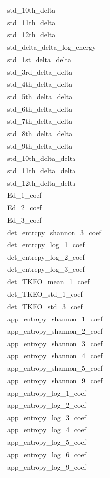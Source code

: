 \documentclass[
]{article}
\begin{document}
\begin{table}
\begin{tabular}{l}
std\_10th\_delta\\
std\_11th\_delta\\
\addlinespace
std\_12th\_delta\\
std\_delta\_delta\_log\_energy\\
std\_1st\_delta\_delta\\
std\_3rd\_delta\_delta\\
std\_4th\_delta\_delta\\
\addlinespace
std\_5th\_delta\_delta\\
std\_6th\_delta\_delta\\
std\_7th\_delta\_delta\\
std\_8th\_delta\_delta\\
std\_9th\_delta\_delta\\
\addlinespace
std\_10th\_delta\_delta\\
std\_11th\_delta\_delta\\
std\_12th\_delta\_delta\\
Ed\_1\_coef\\
Ed\_2\_coef\\
\addlinespace
Ed\_3\_coef\\
det\_entropy\_shannon\_3\_coef\\
det\_entropy\_log\_1\_coef\\
det\_entropy\_log\_2\_coef\\
det\_entropy\_log\_3\_coef\\
\addlinespace
det\_TKEO\_mean\_1\_coef\\
det\_TKEO\_std\_1\_coef\\
det\_TKEO\_std\_3\_coef\\
app\_entropy\_shannon\_1\_coef\\
app\_entropy\_shannon\_2\_coef\\
\addlinespace
app\_entropy\_shannon\_3\_coef\\
app\_entropy\_shannon\_4\_coef\\
app\_entropy\_shannon\_5\_coef\\
app\_entropy\_shannon\_9\_coef\\
app\_entropy\_log\_1\_coef\\
\addlinespace
app\_entropy\_log\_2\_coef\\
app\_entropy\_log\_3\_coef\\
app\_entropy\_log\_4\_coef\\
app\_entropy\_log\_5\_coef\\
app\_entropy\_log\_6\_coef\\
\addlinespace
app\_entropy\_log\_9\_coef\\

\end{tabular}
\end{table}
\end{document}
